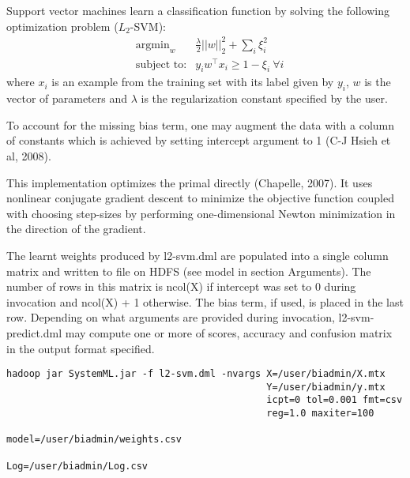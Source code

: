 
Support vector machines learn a classification function by solving the
following optimization problem ($L_2$-SVM):
\begin{eqnarray*}
&\textrm{argmin}_w& \frac{\lambda}{2} ||w||_2^2 + \sum_i \xi_i^2\\
&\textrm{subject to:}& y_i w^{\top} x_i \geq 1 - \xi_i ~ \forall i
\end{eqnarray*}
where $x_i$ is an example from the training set with its label given by $y_i$, 
$w$ is the vector of parameters and $\lambda$ is the regularization constant 
specified by the user.

To account for the missing bias term, one may augment the data with a column
of constants which is achieved by setting intercept argument to 1 (C-J Hsieh 
et al, 2008).

This implementation optimizes the primal directly (Chapelle, 2007). It uses 
nonlinear conjugate gradient descent to minimize the objective function 
coupled with choosing step-sizes by performing one-dimensional Newton 
minimization in the direction of the gradient.
\\


The learnt weights produced by l2-svm.dml are populated into a single column matrix 
and written to file on HDFS (see model in section Arguments). The number of rows in 
this matrix is ncol(X) if intercept was set to 0 during invocation and ncol(X) + 1 
otherwise. The bias term, if used, is placed in the last row. Depending on what arguments
are provided during invocation, l2-svm-predict.dml may compute one or more of scores, 
accuracy and confusion matrix in the output format specified. 
\\


\begin{verbatim}
hadoop jar SystemML.jar -f l2-svm.dml -nvargs X=/user/biadmin/X.mtx 
                                              Y=/user/biadmin/y.mtx 
                                              icpt=0 tol=0.001 fmt=csv
                                              reg=1.0 maxiter=100 
                                              model=/user/biadmin/weights.csv
                                              Log=/user/biadmin/Log.csv
\end{verbatim}

